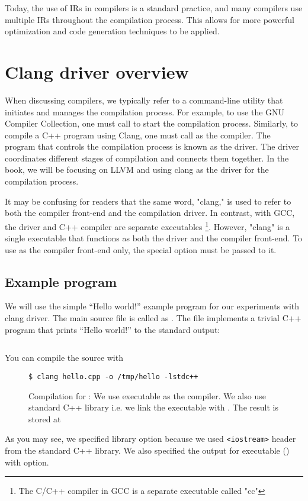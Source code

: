 Today, the use of IRs in compilers is a standard practice, and many compilers
use multiple IRs throughout the compilation process. This allows for more
powerful optimization and code generation techniques to be applied. 


\section{Clang driver overview}
\label{sec:clang_driver}
When discussing compilers, we typically refer to a command-line utility that
initiates and manages the compilation process. For example, to use the GNU
Compiler Collection, one must call  to start the compilation
process. Similarly, to compile a C++ program using Clang, one must call
as the compiler. The program that controls the compilation process is known as
the driver. The driver coordinates different stages of compilation and connects
them together. In the book, we will be focusing on LLVM and using clang as
the driver for the compilation process. 

It may be confusing for readers that the same word, "clang," is used to refer to
both the compiler front-end and the compilation driver. In contrast, with GCC,
the driver and C++ compiler are separate executables
\footnote{The C/C++ compiler
in GCC is a separate executable called "cc"}.
However, "clang" is a single
executable that functions as both the driver and the compiler front-end. To use
\clang as the compiler front-end only, the special option  must be
passed to it. 

\subsection{Example program}
We will use the simple ``Hello world!'' example program for our experiments with
clang driver. The main source file is called as . The
file implements a trivial C++ program that prints ``Hello world!'' to the standard
output: 
\inputminted{c++}{./src/part1/ch2_arch/hello.cpp}

You can compile the source with
\begin{figure}[H]
\begin{verbatim}
$ clang hello.cpp -o /tmp/hello -lstdc++
\end{verbatim}
\caption{Compilation for : We use  executable as
  the compiler. We also use standard C++ library i.e. we link the
  executable 
  with . The result is stored at }
\label{fig:hello_compilation}
\end{figure}
As you may see, we specified  library option because we used
\texttt{<iostream>} header from the standard C++ library. We also
specified the output for executable () with 
option. 

